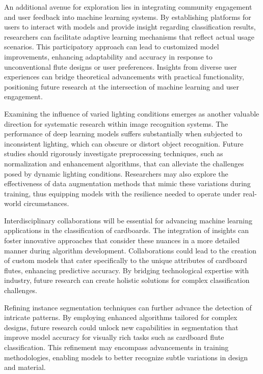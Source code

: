 An additional avenue for exploration lies in integrating community engagement and user feedback into machine learning systems. By establishing platforms for users to interact with models and provide insight regarding classification results, researchers can facilitate adaptive learning mechanisms that reflect actual usage scenarios. This participatory approach can lead to customized model improvements, enhancing adaptability and accuracy in response to unconventional flute designs or user preferences. Insights from diverse user experiences can bridge theoretical advancements with practical functionality, positioning future research at the intersection of machine learning and user engagement.

Examining the influence of varied lighting conditions emerges as another valuable direction for systematic research within image recognition systems. The performance of deep learning models suffers substantially when subjected to inconsistent lighting, which can obscure or distort object recognition. Future studies should rigorously investigate preprocessing techniques, such as normalization and enhancement algorithms, that can alleviate the challenges posed by dynamic lighting conditions. Researchers may also explore the effectiveness of data augmentation methods that mimic these variations during training, thus equipping models with the resilience needed to operate under real-world circumstances.

Interdisciplinary collaborations will be essential for advancing machine learning applications in the classification of cardboards. The integration of insights can foster innovative approaches that consider these nuances in a more detailed manner during algorithm development. Collaborations could lead to the creation of custom models that cater specifically to the unique attributes of cardboard flutes, enhancing predictive accuracy. By bridging technological expertise with industry, future research can create holistic solutions for complex classification challenges.

Refining instance segmentation techniques can further advance the detection of intricate patterns. By employing enhanced algorithms tailored for complex designs, future research could unlock new capabilities in segmentation that improve model accuracy for visually rich tasks such as cardboard flute classification. This refinement may encompass advancements in training methodologies, enabling models to better recognize subtle variations in design and material.

